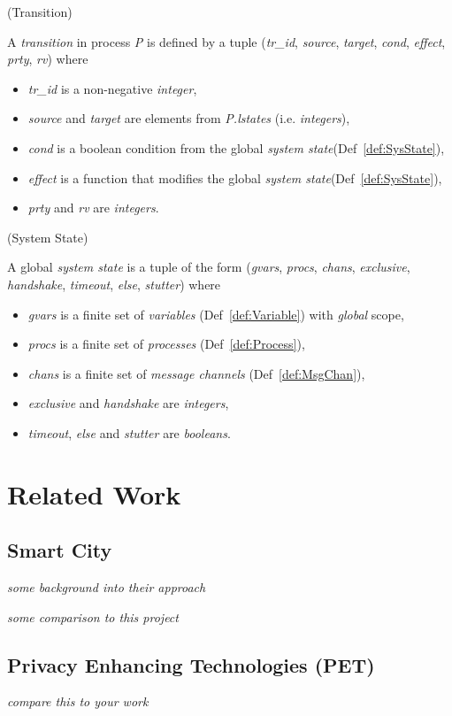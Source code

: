 \begin{definition}{}{}
\label{def:Transition}
(Transition)

A \textit{transition} in process \textit{P} is defined by a tuple (\textit{tr\_id}, \textit{source}, \textit{target}, \textit{cond}, \textit{effect}, \textit{prty}, \textit{rv}) where
\begin{itemize}
\item[] \textit{tr\_id} is a non-negative \textit{integer},
\item[] \textit{source} and \textit{target} are elements from \textit{P.lstates} (i.e. \textit{integers}),
\item[] \textit{cond} is a boolean condition from the global \textit{system state}(Def~\ref{def:SysState}),
\item[] \textit{effect} is a function that modifies the global \textit{system state}(Def~\ref{def:SysState}),
\item[] \textit{prty} and \textit{rv} are \textit{integers}.
\end{itemize}
\end{definition}

\begin{definition}{}{}
\label{def:SysState}
(System State)

A global \textit{system state} is a tuple of the form  (\textit{gvars}, \textit{procs}, \textit{chans}, \textit{exclusive}, \textit{handshake}, \textit{timeout}, \textit{else}, \textit{stutter}) where
\begin{itemize}
\item[] \textit{gvars} is a finite set of \textit{variables} (Def~\ref{def:Variable}) with \textit{global} scope,
\item[] \textit{procs} is a finite set of \textit{processes} (Def~\ref{def:Process}),
\item[] \textit{chans} is a finite set of \textit{message channels} (Def~\ref{def:MsgChan}),
\item[] \textit{exclusive} and \textit{handshake} are \textit{integers},
\item[] \textit{timeout}, \textit{else} and \textit{stutter} are \textit{booleans}.
\end{itemize}
\end{definition}

\section{Related Work}
\subsection{Smart City} 

\textit{some background into their approach}\cite{li2016privacy}

\textit{some comparison to this project}


\subsection{Privacy Enhancing Technologies (PET)}

\textit{compare this to your work}
